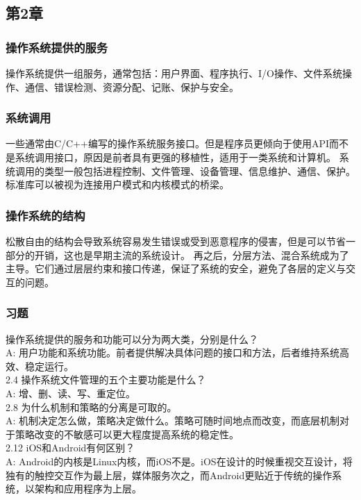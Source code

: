 \documentclass[../main.tex]{subfiles}
\begin{document}
    \subsection{第2章}
    \subsubsection{操作系统提供的服务}
    操作系统提供一组服务，通常包括：用户界面、程序执行、I/O操作、文件系统操作、通信、错误检测、资源分配、记账、保护与安全。
    \subsubsection{系统调用}
    一些通常由C/C++编写的操作系统服务接口。但是程序员更倾向于使用API而不是系统调用接口，原因是前者具有更强的移植性，适用于一类系统和计算机。
    系统调用的类型一般包括进程控制、文件管理、设备管理、信息维护、通信、保护。标准库可以被视为连接用户模式和内核模式的桥梁。
    \subsubsection{操作系统的结构}
    松散自由的结构会导致系统容易发生错误或受到恶意程序的侵害，但是可以节省一部分的开销，这也是早期主流的系统设计。
    再之后，分层方法、混合系统成为了主导。它们通过层层约束和接口传递，保证了系统的安全，避免了各层的定义与交互的问题。
    \subsubsection{习题}
     操作系统提供的服务和功能可以分为两大类，分别是什么？ \\
    A: 用户功能和系统功能。前者提供解决具体问题的接口和方法，后者维持系统高效、稳定运行。 \\
    2.4 操作系统文件管理的五个主要功能是什么？ \\
    A: 增、删、读、写、重定位。 \\
    2.8 为什么机制和策略的分离是可取的。 \\
    A: 机制决定怎么做，策略决定做什么。策略可随时间地点而改变，而底层机制对于策略改变的不敏感可以更大程度提高系统的稳定性。\\
    2.12 iOS和Android有何区别？ \\
    A: Android的内核是Linux内核，而iOS不是。iOS在设计的时候重视交互设计，将独有的触控交互作为最上层，媒体服务次之，而Android更贴近于传统的操作系统，以架构和应用程序为上层。
\end{document}
